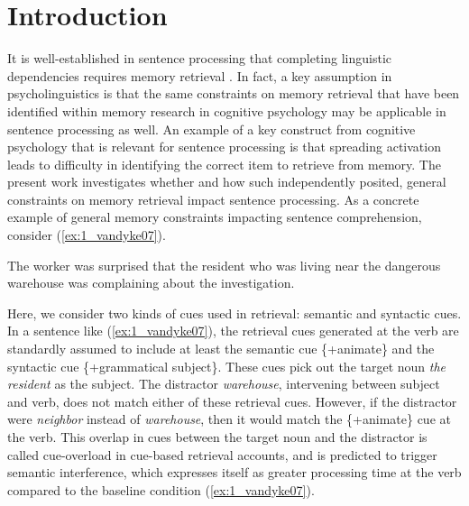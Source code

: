 \documentclass[review,preprint,12pt,authoryear,floatsintext]{elsarticle}
\begin{document}
\newpage

\section{Introduction}

{
It is well-established in sentence processing that completing linguistic dependencies requires memory retrieval \citep[see e.g., ][]{lewis06}. In fact, a key assumption in psycholinguistics is that the same constraints on memory retrieval that have been identified within memory research in cognitive psychology \citep[e.g., ][]{anderson_etal_2004_ACT_R} may be applicable in sentence processing as well. An example of a key construct from cognitive psychology that is relevant for sentence processing is that spreading activation leads to difficulty in identifying the correct item to retrieve from memory. The present work investigates whether and how such independently posited, general constraints on memory retrieval impact sentence processing. As a concrete example of general memory constraints impacting sentence comprehension, consider (\ref{ex:1_vandyke07}).

\begin{exe}[ht]
\ex \label{ex:1_vandyke07} 
The worker was surprised that the resident who was living near the dangerous warehouse was complaining about the investigation. \citep{vandyke07}
\end{exe}
}

Here, we consider two kinds of cues used in retrieval: semantic and  syntactic cues.
In a sentence like (\ref{ex:1_vandyke07}), the retrieval cues generated at the verb are standardly assumed \citep[e.g.,][]{vandyke07} to include at least the semantic cue \{+animate\} and the syntactic cue \{+grammatical subject\}. These cues pick out the target noun \textit{the resident} as the subject. The distractor \textit{warehouse}, intervening between subject and verb, does not match either of these retrieval cues. However, if the distractor were \textit{neighbor} instead of \textit{warehouse}, then it would match the \{+animate\} cue at the verb. This overlap in cues between the target noun and the distractor is called cue-overload in cue-based retrieval accounts, and is predicted to trigger semantic interference, which expresses itself as greater processing time at the verb compared to the baseline condition (\ref{ex:1_vandyke07}).
\end{document}
